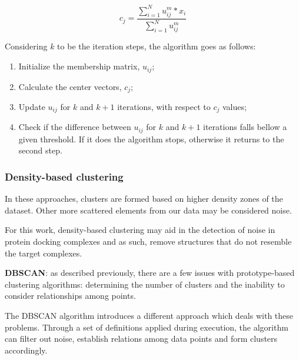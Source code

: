 $$c_j = \frac{\sum_{i=1}^{N} u_{ij}^m * x_i}{\sum_{i=1}^{N}u_{ij}^m}$$

Considering $k$ to be the iteration steps, the algorithm goes as follows:
\begin{enumerate}
	\item Initialize the membership matrix, $u_{ij}$;
	\item Calculate the center vectors, $c_j$;  
	\item Update $u_{ij}$ for $k$ and $k+1$ iterations, with respect to $c_j$ values;
	\item Check if the difference between $u_{ij}$ for $k$ and $k+1$ iterations falls bellow a given threshold. If it does the algorithm stops, otherwise it returns to the second step. 
\end{enumerate}

\subsubsection{Density-based clustering}

In these approaches, clusters are formed based on higher density zones of the dataset. Other more scattered elements from our data may be considered noise. 

For this work, density-based clustering may aid in the detection of noise in protein docking complexes and as such, remove structures that do not resemble the target complexes.

\textbf{DBSCAN}: as described previously, there are a few issues with prototype-based clustering algorithms: determining the number of clusters and the inability to consider relationships among points. 

The \gls{DBSCAN} \cite{ester1996density} algorithm introduces a different approach which deals with these problems. Through a set of definitions applied during execution, the algorithm can filter out noise, establish relations among data points and form clusters accordingly.

